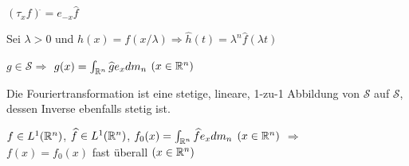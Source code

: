 \documentclass{article}
\begin{document}
\begin{satz}
\begin{liste}
\item $(\tau_x f)^{\widehat{}} = e_{-x} \widehat{f}$
\item Sei $\lambda > 0$ und $h(x) = f(x / \lambda) \Rightarrow \widehat{h}(t) = \lambda^n\widehat{f}(\lambda t)$
\end{liste}
\end{satz}
\begin{satz} 
\begin{liste}
\item $g \in \mathcal{S} \Rightarrow$ $g(x) = \int_{\mathbb{R}^n} \widehat{g} e_x dm_n$ $(x \in \mathbb{R}^n)$
\item Die Fouriertransformation ist eine stetige, lineare, 1-zu-1 Abbildung von $\mathcal{S}$ auf $\mathcal{S}$, dessen Inverse ebenfalls stetig ist.
\item $ f \in L^1(\mathbb{R}^n)$, $\widehat{f} \in L^1(\mathbb{R}^n)$, $f_0(x) = \int_{\mathbb{R}^n} \widehat{f}e_x dm_n$ $(x \in \mathbb{R}^n)$ $ \Rightarrow$  \\
	  $f(x) = f_0(x)$ fast überall $(x \in \mathbb{R}^n)$
\end{liste}
\end{satz}
\end{document}
